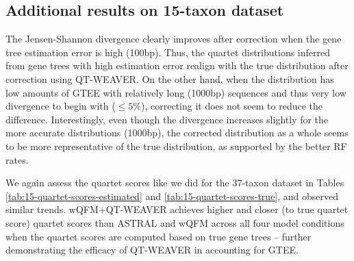 \documentclass[runningheads]{llncs}
\begin{document}
\begin{appendices}
\clearpage

\subsection{Additional results on 15-taxon dataset}
\label{app:15-taxon}

The Jensen-Shannon divergence clearly improves after correction when the gene tree estimation error is high (100bp). Thus, the quartet distributions inferred from gene trees with high estimation error realign with the true distribution after correction using QT-WEAVER. On the other hand, when the distribution has low amounts of GTEE with relatively long (1000bp) sequences and thus very low divergence to begin with ($\le 5$\%), correcting it does not seem to reduce the difference. Interestingly, even though the divergence increases slightly for the more accurate distributions (1000bp), the corrected distribution as a whole seems to be more representative of the true distribution, as supported by the better RF rates.

We again assess the quartet scores like we did for the 37-taxon dataset in Tables \ref{tab:15-quartet-scores-estimated} and \ref{tab:15-quartet-scores-true}, and observed similar trends. wQFM+QT-WEAVER achieves higher and closer (to true quartet score) quartet scores than ASTRAL and wQFM across all four model conditions when the quartet scores are computed based on true gene trees -- further demonstrating the efficacy of QT-WEAVER in accounting for GTEE. 



\vspace{-22pt}
\begin{table}[h!]
    \centering
    \caption{The Jensen-Shannon divergence with respect to the true gene trees for different model conditions averaged over all replicates for the 15-taxon dataset. The best-performing method (i.e., the least amount of divergence) for each model condition has been highlighted in bold.}
    \label{tab:15-divergence}


\end{table}
\end{appendices}
\end{document}
